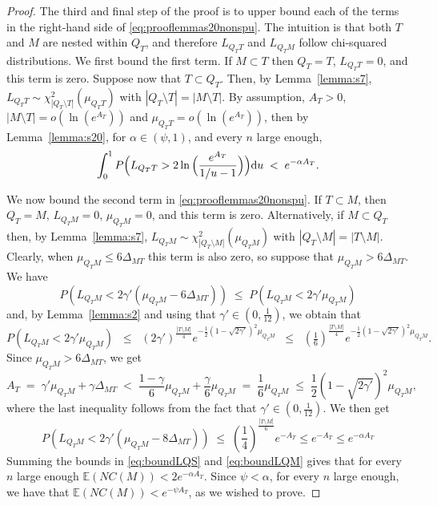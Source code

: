 \documentclass[bj,authoryear]{imsart}
\theoremstyle{plain}
\newcommand{\E}{\mathbb{E}}
\begin{document}
\begin{proof}
The third and final step of the proof is to upper bound each of the terms in the right-hand side of \eqref{eq:prooflemmas20nonspu}. The intuition is that both $T$ and $M$ are nested within $Q_T$, and therefore $L_{Q_T T}$ and $L_{Q_T M}$ follow chi-squared distributions.
We first bound the first term. %
If $M \subset T$ then $Q_T=T$, $L_{Q_TT}=0$, and this term is zero. Suppose now that $T \subset Q_T$. %
Then, by Lemma~\ref{lemma:s7}, %
$L_{Q_TT} \sim \mathcal{\chi}_{|Q_T\setminus T|}^2(\mu_{Q_TT})$ with $|Q_T\setminus T|=|M\setminus T|$. By assumption, $A_T>0$, $|M\setminus T|=o(\ln(e^{A_T}))$ and $\mu_{Q_TT}=o(\ln(e^{A_T}))$, then  by Lemma~\ref{lemma:s20}, for $\alpha\in(\psi,1)$, and every $n$ large enough,
\begin{equation}\label{eq:boundLQS}
\int_0^1P\Bigl(L_{Q_TT}>2\ln{\Bigl(\frac{e^{A_T}}{1 / u-1}\Bigl)}\Bigl){\rm d}u \;<\; 
e^{-\alpha A_T}.
\end{equation}

We now bound the second term in \eqref{eq:prooflemmas20nonspu}. If $T \subset M$, then $Q_T=M$, $L_{Q_TM}=0$, $\mu_{Q_TM}=0$, and this term is zero. Alternatively, if $M \subset Q_T$ %
then, by Lemma~\ref{lemma:s7}, $L_{Q_TM} \sim \chi_{|Q_T\setminus M|}^2(\mu_{Q_TM})$ with $|Q_T\setminus M|=|T\setminus M|$.
Clearly, when $\mu_{Q_TM}\leq 6\Delta_{MT}$ this term is also zero, so suppose that $\mu_{Q_TM}> 6\Delta_{MT}$.  
We have  
$$P\left(L_{Q_TM}<2\gamma'(\mu_{Q_TM}-6\Delta_{MT})\right)\; \leq \; P\left(L_{Q_TM}<2\gamma'\mu_{Q_TM}\right)$$ 
and, by Lemma~\ref{lemma:s2} and using that $\gamma'\in (0,\tfrac{1}{12})$, we obtain that 
$$P\left(L_{Q_TM}<2\gamma'\mu_{Q_TM}\right) \;\;\leq\;\; (2\gamma')^{\frac{|T\setminus M|}{4}} e^{-\frac{1}{2}(1-\sqrt{2\gamma'})^2\mu_{Q_TM}}\;\;\leq\;\;  (\tfrac16)^{\frac{|T\setminus M|}{4}}e^{-\frac{1}{2}(1-\sqrt{2\gamma'})^2\mu_{Q_TM}}.$$
Since $\mu_{Q_TM}>6\Delta_{MT}$, we get
$$
A_T\;=\;\gamma'\mu_{Q_TM}+\gamma\Delta_{MT}\;<\;\frac{1-\gamma}{6}\mu_{Q_TM}+\frac{\gamma}{6}\mu_{Q_TM}\;=\;\frac16\mu_{Q_TM}\;\leq\;\frac12(1-\sqrt{2\gamma'})^2\mu_{Q_TM},
$$
where the last inequality follows from the fact that $\gamma'\in(0, \tfrac{1}{12})$. We then get
\begin{equation}\label{eq:boundLQM}
    P\left(L_{Q_TM}<2\gamma'(\mu_{Q_TM}-8\Delta_{MT})\right) \;\leq\; \left(\frac14\right)^{\frac{|T\setminus M|}{6}}e^{-A_T} \leq e^{-A_T}\leq e^{-\alpha A_T}
\end{equation}
Summing the bounds in \eqref{eq:boundLQS} and \eqref{eq:boundLQM} gives that for every $n$ large enough $\E\left(NC(M)\right) < 2e^{-\alpha A_T}$. Since $\psi<\alpha$, for every $n$ large enough, we have that $\E\left(NC(M)\right) < e^{-\psi A_T}$, as we wished to prove.
\end{proof}
\end{document}

